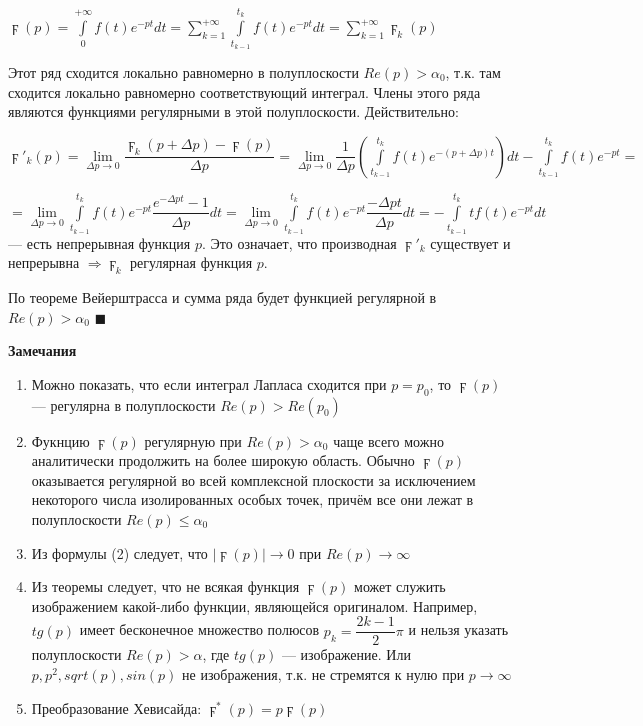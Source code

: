 \documentclass[a4paper, 12pt]{report}
\newenvironment{Proof}
{\par\noindent{\bf Доказательство.}}
{\hfill$\scriptstyle\blacksquare$}
\begin{document}
\begin{Proof}
\begin{center}
    $\digamma(p) = \int\limits_0^{+\infty}f(t)e^{-pt}dt = \sum\limits_{k=1}^{+\infty}\int\limits_{t_{k-1}}^{t_k}f(t)e^{-pt}dt = \sum\limits_{k=1}^{+\infty}\digamma_k(p)$
\end{center}

Этот ряд сходится локально равномерно в полуплоскости $Re(p) > \alpha_0$, т.к. там сходится локально равномерно соответствующий интеграл. Члены этого ряда являются функциями регулярными в этой полуплоскости. Действительно:

$\digamma'_k(p) = \lim\limits_{\Delta p \rightarrow 0}\dfrac{\digamma_k(p + \Delta p) - \digamma(p)}{\Delta p} = \lim\limits_{\Delta p \rightarrow 0} \dfrac{1}{\Delta p}(\int\limits_{t_{k-1}}^{t_k}f(t)e^{-(p + \Delta p)t})dt - \int\limits_{t_{k-1}}^{t_k}f(t)e^{-pt} = $ 

$ = \lim\limits_{\Delta p \rightarrow 0}\int\limits_{t_{k-1}}^{t_k}f(t)e^{-pt}\dfrac{e^{-\Delta pt} - 1}{\Delta p}dt = \lim\limits_{\Delta p \rightarrow 0}\int\limits_{t_{k-1}}^{t_k}f(t)e^{-pt}\dfrac{-\Delta pt}{\Delta p}dt = -\int\limits_{t_{k-1}}^{t_k}tf(t)e^{-pt}dt$ --- есть непрерывная функция $p$. Это означает, что производная $\digamma'_k$ существует и непрерывна $\Rightarrow \digamma_k$ регулярная функция $p$.

По теореме Вейерштрасса и сумма ряда будет функцией регулярной в $Re(p) > \alpha_0$
\end{Proof}
\par\bigskip

\textbf{Замечания}

\begin{enumerate}
    \item Можно показать, что если интеграл Лапласа сходится при $p = p_0$, то $\digamma(p)$ --- регулярна в полуплоскости $Re(p) > Re(p_0)$
    \item Фукнцию $\digamma(p)$ регулярную при $Re(p) > \alpha_0$ чаще всего можно аналитически продолжить на более широкую область. Обычно $\digamma(p)$ оказывается регулярной во всей комплексной плоскости за исключением некоторого числа изолированных особых точек, причём все они лежат в полуплоскости $Re(p) \leq \alpha_0$
    \item Из формулы (2) следует, что $|\digamma(p)| \rightarrow 0$ при $Re(p) \rightarrow \infty$
    \item Из теоремы следует, что не всякая функция $\digamma(p)$ может служить изображением какой-либо функции, являющейся оригиналом. Например, $tg(p)$ имеет бесконечное множество полюсов $p_k = \dfrac{2k - 1}{2}\pi$ и нельзя указать полуплоскости $Re(p) > \alpha$, где $tg(p)$ --- изображение. Или $p, p^2, sqrt(p), sin(p)$ не изображения, т.к. не стремятся к нулю при $p \rightarrow \infty$
    \item Преобразование Хевисайда: $\digamma^*(p) = p\digamma(p)$
\end{enumerate}
\end{document}
